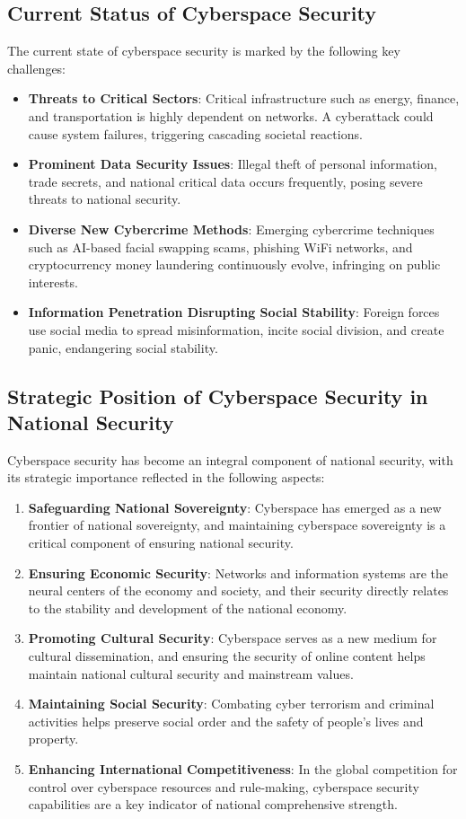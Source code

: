 \documentclass[12pt, a4paper]{article}
\begin{document}
\subsection{Current Status of Cyberspace Security}
The current state of cyberspace security is marked by the following key challenges:
\begin{itemize}
    \item \textbf{Threats to Critical Sectors}: Critical infrastructure such as energy, finance, and transportation is highly dependent on networks. A cyberattack could cause system failures, triggering cascading societal reactions.
    \item \textbf{Prominent Data Security Issues}: Illegal theft of personal information, trade secrets, and national critical data occurs frequently, posing severe threats to national security.
    \item \textbf{Diverse New Cybercrime Methods}: Emerging cybercrime techniques such as AI-based facial swapping scams, phishing WiFi networks, and cryptocurrency money laundering continuously evolve, infringing on public interests.
    \item \textbf{Information Penetration Disrupting Social Stability}: Foreign forces use social media to spread misinformation, incite social division, and create panic, endangering social stability.
\end{itemize}

\subsection{Strategic Position of Cyberspace Security in National Security}
Cyberspace security has become an integral component of national security, with its strategic importance reflected in the following aspects:
\begin{enumerate}
    \item \textbf{Safeguarding National Sovereignty}: Cyberspace has emerged as a new frontier of national sovereignty, and maintaining cyberspace sovereignty is a critical component of ensuring national security.
    \item \textbf{Ensuring Economic Security}: Networks and information systems are the neural centers of the economy and society, and their security directly relates to the stability and development of the national economy.
    \item \textbf{Promoting Cultural Security}: Cyberspace serves as a new medium for cultural dissemination, and ensuring the security of online content helps maintain national cultural security and mainstream values.
    \item \textbf{Maintaining Social Security}: Combating cyber terrorism and criminal activities helps preserve social order and the safety of people's lives and property.
    \item \textbf{Enhancing International Competitiveness}: In the global competition for control over cyberspace resources and rule-making, cyberspace security capabilities are a key indicator of national comprehensive strength.
\end{enumerate}
\end{document}
